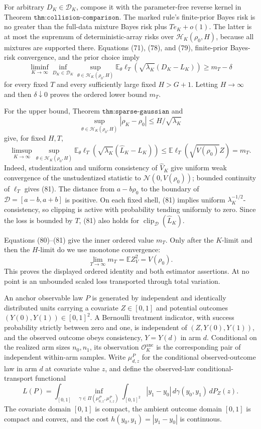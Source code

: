 For arbitrary \(D_K\in\mathscr D_K\), compose it with the parameter-free
reverse kernel in Theorem \(\texttt{thm:collision-comparison}\).  The
marked rule's finite-prior Bayes risk is no greater than the full-data
mixture Bayes risk plus \(Te_K+o(1)\).  The latter is at most the
supremum of deterministic-array risks over
\(\mathcal H_K(\rho_0,H)\), because all mixtures are supported there.
Equations (71), (78), and (79), finite-prior Bayes-risk convergence, and
the prior choice imply
\[
 \liminf_{K\to\infty}
 \inf_{D_K\in\mathscr D_K}
 \sup_{\theta\in\mathcal H_K(\rho_0,H)}
 \mathbb E_\theta\ell_T\!\left(
 \sqrt{\lambda_K}(D_K-L_K)\right)
 \ge m_T-\delta
 \tag{80}
\]
for every fixed \(T\) and every sufficiently large fixed \(H>G+1\).
Letting \(H\to\infty\) and then \(\delta\downarrow0\) proves the ordered
lower bound \(m_T\).

For the upper bound, Theorem \(\texttt{thm:sparse-gaussian}\) and
\[
 \sup_{\theta\in\mathcal H_K(\rho_0,H)}
 |\rho_K-\rho_0|\le H/\sqrt{\lambda_K}
\]
give, for fixed \(H,T\),
\[
 \limsup_{K\to\infty}
 \sup_{\theta\in\mathcal H_K(\rho_0,H)}
 \mathbb E_\theta\ell_T\!\left(
 \sqrt{\lambda_K}(\widehat L_K-L_K)\right)
 \le
 \mathbb E\ell_T(\sqrt{V(\rho_0)}Z)
 =m_T.
 \tag{81}
\]
Indeed, studentization and uniform consistency of \(\widehat V_K\)
give uniform weak convergence of the unstudentized statistic to
\(\mathcal N(0,V(\rho_0))\); bounded continuity of \(\ell_T\) gives
(81).  The distance from \(a-b\rho_0\) to the boundary of
\(\mathcal D=[a-b,a+b]\) is positive.  On each fixed shell, (81)
implies uniform \(\lambda_K^{-1/2}\)-consistency, so clipping is active
with probability tending uniformly to zero.  Since the loss is bounded
by \(T\), (81) also holds for
\(\operatorname{clip}_{\mathcal D}(\widehat L_K)\).

Equations (80)--(81) give the inner ordered value \(m_T\).  Only after
the \(K\)-limit and then the \(H\)-limit do we use monotone convergence:
\[
 \lim_{T\to\infty}m_T
 =\mathbb EZ_V^2
 =V(\rho_0).
 \tag{82}
\]
This proves the displayed ordered identity and both estimator
assertions.  At no point is an unbounded scaled loss transported through
total variation.

An anchor observable law \(P\) is generated by independent and
identically distributed units carrying a covariate \(Z\in[0,1]\) and
potential outcomes \((Y(0),Y(1))\in[0,1]^2\).  A Bernoulli treatment
indicator, with success probability strictly between zero and one, is
independent of \((Z,Y(0),Y(1))\), and the observed outcome obeys
consistency, \(Y=Y(d)\) in arm \(d\).  Conditional on the realized arm
sizes \(n_0,n_1\), its observation \(\mathcal O_K^{\mathrm{anc}}\) is
the corresponding pair of independent within-arm samples.  Write
\(\mu_{d,z}^P\) for the conditional observed-outcome law in arm \(d\)
at covariate value \(z\), and define the observed-law
conditional-transport functional
\[
 L(P)=\int_{[0,1]}
 \inf_{\gamma\in\Pi(\mu_{0,z}^P,\mu_{1,z}^P)}
 \int_{[0,1]^2}|y_1-y_0|\,d\gamma(y_0,y_1)\,dP_Z(z).
 \tag{41}
\]
The covariate domain \([0,1]\) is compact, the ambient outcome domain
\([0,1]\) is compact and convex, and the cost
\(h(y_0,y_1)=|y_1-y_0|\) is continuous.

